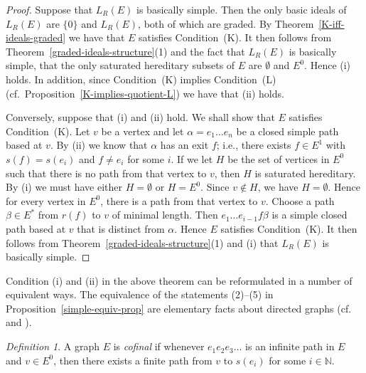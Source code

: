 \documentclass[11pt]{amsart}
\theoremstyle{remark}
\newtheorem{definition}[theorem]{Definition}
\numberwithin{equation}{section}
\newcommand{\N}{\mathbb{N}}
\begin{document}
\begin{proof}
Suppose that $L_R(E)$ is basically simple.  Then the only basic ideals of $L_R(E)$ are $\{0\}$ and $L_R(E)$, both of which are graded.  By Theorem~\ref{K-iff-ideals-graded} we have that $E$ satisfies Condition~(K).  It then follows from Theorem~\ref{graded-ideals-structure}(1) and the fact that $L_R(E)$ is basically simple, that the only saturated hereditary subsets of $E$ are $\emptyset$ and $E^0$.  Hence (i) holds.  In addition, since Condition~(K) implies Condition~(L) (cf.~Proposition~\ref{K-implies-quotient-L}) we have that (ii) holds.

Conversely, suppose that (i) and (ii) hold.  We shall show that $E$ satisfies Condition~(K).  Let $v$ be a vertex and let $\alpha = e_1 \ldots e_n$ be a closed simple path based at $v$.  By (ii) we know that $\alpha$ has an exit $f$; i.e., there exists $f \in E^1$ with $s(f) = s(e_i)$ and $f \neq e_i$ for some $i$.  If we let $H$ be the set of vertices in $E^0$ such that there is no path from that vertex to $v$, then $H$ is saturated hereditary.  By (i) we must have either $H = \emptyset$ or $H = E^0$.  Since $v \notin H$, we have $H = \emptyset$.  Hence for every vertex in $E^0$, there is a path from that vertex to $v$.  Choose a path $\beta \in E^*$ from $r(f)$ to $v$ of minimal length.  Then $e_1 \ldots e_{i-1} f \beta$ is a simple closed path based at $v$ that is distinct from $\alpha$.  Hence $E$ satisfies Condition~(K).  It then follows from Theorem~\ref{graded-ideals-structure}(1) and (i) that $L_R(E)$ is basically simple.
\end{proof}


Condition (i) and (ii) in the above theorem can be reformulated in a number of equivalent ways.  The equivalence of the statements (2)--(5) in Proposition~\ref{simple-equiv-prop} are elementary facts about directed graphs (cf.~\cite[Theorem~1.23]{Tom9} and \cite[Proposition~3.2]{AbrPino3}).


\begin{definition}
A graph $E$ is \emph{cofinal} if whenever $e_1 e_2 e_3 \ldots$ is an infinite path in $E$ and $v \in E^0$, then there exists a finite path from $v$ to $s(e_i)$ for some $i \in \N$.
\end{definition}
\end{document}
